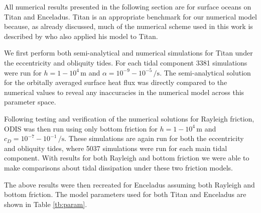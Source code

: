 All numerical results presented in the following section are for surface oceans on Titan and Enceladus. Titan is an appropriate benchmark for our numerical model because, as already discussed, much of the numerical scheme used in this work is described by \citet{sears1995tidal} who also applied his model to Titan.

We first perform both semi-analytical and numerical simulations for Titan under the eccentricity and obliquity tides. For each tidal component 3381 simulations were run for \hbox{$h = 1 - 10^4 \, \si{\metre}$} and \hbox{$\alpha = 10^{-9} - 10^{-5} \, \si{\per\second}$}. The semi-analytical solution for the orbitally averaged surface heat flux was directly compared to the numerical values to reveal any inaccuracies in the numerical model across this parameter space. 

Following testing and verification of the numerical solutions for Rayleigh friction, ODIS was then run using only bottom friction for \hbox{$h = 1 - 10^4 \, \si{\metre}$} and \hbox{$c_D = 10^{-7} - 10^{-1} \, \si{\per\second}$}. These simulations are again run for both the eccentricity and obliquity tides, where 5037 simulations were run for each main tidal component. With results for both Rayleigh and bottom friction we were able to make comparisons about tidal dissipation under these two friction models.

The above results were then recreated for Enceladus assuming both Rayleigh and bottom friction. The model parameters used for both Titan and Enceladus are shown in Table \ref{tb:param}.



